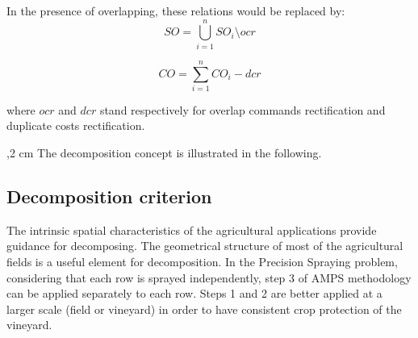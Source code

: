 In the presence of overlapping, these relations would be replaced by:
\begin{equation} \label{eq:SOSOi_m}
    SO = \overset{n}{\underset{i=1}{\bigcup}} SO_{i} \setminus ocr
\end{equation}

\begin{equation} \label{eq:COCOi_m}
    CO = \overset{n}{\underset{i=1}{\sum}} CO_{i} - dcr
\end{equation}

where $ocr$ and $dcr$ stand respectively for overlap commands rectification and duplicate costs rectification.

,2 cm
The decomposition concept is illustrated in the following.

\subsection{Decomposition criterion}

The intrinsic spatial characteristics of the agricultural applications provide guidance for decomposing. The geometrical structure of most of the agricultural fields is a useful element for decomposition. In the Precision Spraying problem, considering that each row is sprayed independently, step 3 of AMPS methodology can be applied separately to each row. Steps 1 and 2 are better applied at a larger scale (field or vineyard) in order to have consistent crop protection of the vineyard.


